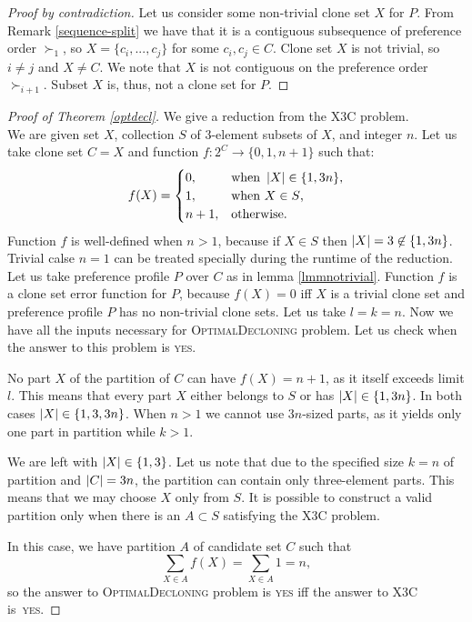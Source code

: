 \begin{proof}[Proof by contradiction]
Let us consider some non-trivial clone set $X$ for $P$.
From Remark \ref{sequence-split} we have that it is a contiguous subsequence of preference order $\succ_1$,
so $X = \{c_i, ..., c_j\}$ for some $c_i, c_j \in C$.
Clone set $X$ is not trivial, so $i\neq{j}$ and $X\neq{C}$.
We note that $X$ is not contiguous on the preference order $\succ_{i+1}$.
Subset $X$ is, thus, not a clone set for $P$.
\end{proof}

\begin{proof}[Proof of Theorem \ref{optdecl}]
We give a reduction from the \textsc{X3C} problem. \\
We are given set $X$, collection $S$ of 3-element subsets of $X$, and integer $n$.
Let us take clone set $C = X$ and function $f:2^C\rightarrow \{0,1,n+1\}$ such that:
$$ f(X) =
\begin{cases}
0, &\text{when } \left\vert X \right\vert \in \{1,3n\} \text{,} \\
1, &\text{when }  X \in S \text{,} \\
n+1, &\text{otherwise.}
\end{cases}
$$
Function $f$ is well-defined when $n>1$, because if $X \in S$ then $\left\vert X \right\vert = 3 \not\in \{1,3n\}$.
Trivial calse $n=1$ can be treated specially during the runtime of the reduction.
Let us take preference profile $P$ over $C$ as in lemma \ref{lmmnotrivial}.
Function $f$ is a clone set error function for $P$, because $f(X) = 0$ iff $X$ is a trivial clone set
and preference profile $P$ has no non-trivial clone sets.
Let us take $l=k=n$.
Now we have all the inputs necessary for \textsc{OptimalDecloning} problem.
Let us check when the answer to this problem is \textsc{yes}.

No part $X$ of the partition of $C$ can have $f(X)=n+1$, as it itself exceeds limit $l$.
This means that every part $X$ either belongs to $S$ or has $\left\vert X \right\vert \in \{1,3n\}$.
In both cases $\left\vert X \right\vert \in \{1,3,3n\}$.
When $n>1$ we cannot use $3n$-sized parts,
as it yields only one part in partition while $k>1$.

We are left with $\left\vert X \right\vert \in \{1,3\}$.
Let us note that due to the specified size $k=n$ of partition and $\left\vert C \right\vert = 3n$,
the partition can contain only three-element parts.
This means that we may choose $X$ only from $S$.
It is possible to construct a valid partition only when there is an $A \subset S$ satisfying the \textsc{X3C} problem.

In this case, we have partition $A$ of candidate set $C$ such that
$$ \sum_{X \in A} f(X) = \sum_{X \in A} 1 = n,$$
so the answer to \textsc{OptimalDecloning} problem is \textsc{yes}
iff the answer to \textsc{X3C} is~\textsc{yes}.
\end{proof}




